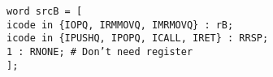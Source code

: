 \documentclass{article}
\begin{document}
\texttt{word srcB = [ \\
	\hspace*{17mm}icode in \{IOPQ, IRMMOVQ, IMRMOVQ\} : rB; \\
	\hspace*{17mm}icode in \{IPUSHQ, IPOPQ, ICALL, IRET\} : RRSP; \\
	\hspace*{17mm}1 : RNONE; \# Don't need register \\
\hspace*{5mm}];}
\end{document}
